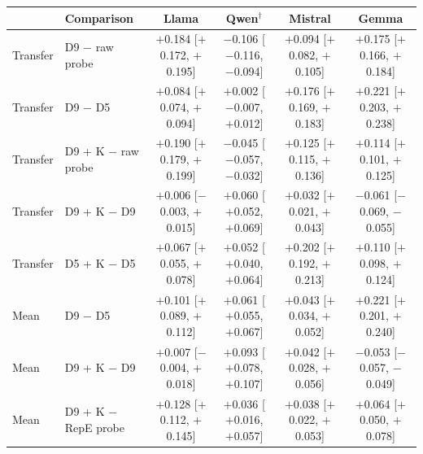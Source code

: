 \begin{tabular}{@{}ll cccc@{}}
\toprule
& Comparison & Llama & Qwen$^\dagger$ & Mistral & Gemma \\
\midrule
Transfer & D9 $-$ raw probe & $+$0.184 [$+$0.172, $+$0.195] & $-$0.106 [$-$0.116, $-$0.094] & $+$0.094 [$+$0.082, $+$0.105] & $+$0.175 [$+$0.166, $+$0.184] \\
Transfer & D9 $-$ D5 & $+$0.084 [$+$0.074, $+$0.094] & $+$0.002 [$-$0.007, $+$0.012] & $+$0.176 [$+$0.169, $+$0.183] & $+$0.221 [$+$0.203, $+$0.238] \\
Transfer & D9 + K $-$ raw probe & $+$0.190 [$+$0.179, $+$0.199] & $-$0.045 [$-$0.057, $-$0.032] & $+$0.125 [$+$0.115, $+$0.136] & $+$0.114 [$+$0.101, $+$0.125] \\
Transfer & D9 + K $-$ D9 & $+$0.006 [$-$0.003, $+$0.015] & $+$0.060 [$+$0.052, $+$0.069] & $+$0.032 [$+$0.021, $+$0.043] & $-$0.061 [$-$0.069, $-$0.055] \\
Transfer & D5 + K $-$ D5 & $+$0.067 [$+$0.055, $+$0.078] & $+$0.052 [$+$0.040, $+$0.064] & $+$0.202 [$+$0.192, $+$0.213] & $+$0.110 [$+$0.098, $+$0.124] \\
Mean & D9 $-$ D5 & $+$0.101 [$+$0.089, $+$0.112] & $+$0.061 [$+$0.055, $+$0.067] & $+$0.043 [$+$0.034, $+$0.052] & $+$0.221 [$+$0.201, $+$0.240] \\
Mean & D9 + K $-$ D9 & $+$0.007 [$-$0.004, $+$0.018] & $+$0.093 [$+$0.078, $+$0.107] & $+$0.042 [$+$0.028, $+$0.056] & $-$0.053 [$-$0.057, $-$0.049] \\
Mean & D9 + K $-$ RepE probe & $+$0.128 [$+$0.112, $+$0.145] & $+$0.036 [$+$0.016, $+$0.057] & $+$0.038 [$+$0.022, $+$0.053] & $+$0.064 [$+$0.050, $+$0.078] \\
\bottomrule
\end{tabular}
